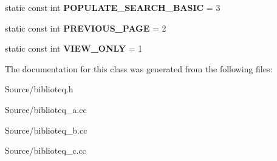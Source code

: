 \begin{DoxyCompactItemize}
\item 
static const int {\bfseries P\+O\+P\+U\+L\+A\+T\+E\+\_\+\+S\+E\+A\+R\+C\+H\+\_\+\+B\+A\+S\+IC} = 3\hypertarget{classbiblioteq_a6a528227ec1b55674079308da819ca21}{}\label{classbiblioteq_a6a528227ec1b55674079308da819ca21}

\item 
static const int {\bfseries P\+R\+E\+V\+I\+O\+U\+S\+\_\+\+P\+A\+GE} = 2\hypertarget{classbiblioteq_a68406e00aad96ddd05dd6ff2d9017f5f}{}\label{classbiblioteq_a68406e00aad96ddd05dd6ff2d9017f5f}

\item 
static const int {\bfseries V\+I\+E\+W\+\_\+\+O\+N\+LY} = 1\hypertarget{classbiblioteq_a11f44b308723c9036be111822a8307be}{}\label{classbiblioteq_a11f44b308723c9036be111822a8307be}

\end{DoxyCompactItemize}


The documentation for this class was generated from the following files\+:\begin{DoxyCompactItemize}
\item 
Source/biblioteq.\+h\item 
Source/biblioteq\+\_\+a.\+cc\item 
Source/biblioteq\+\_\+b.\+cc\item 
Source/biblioteq\+\_\+c.\+cc\end{DoxyCompactItemize}
